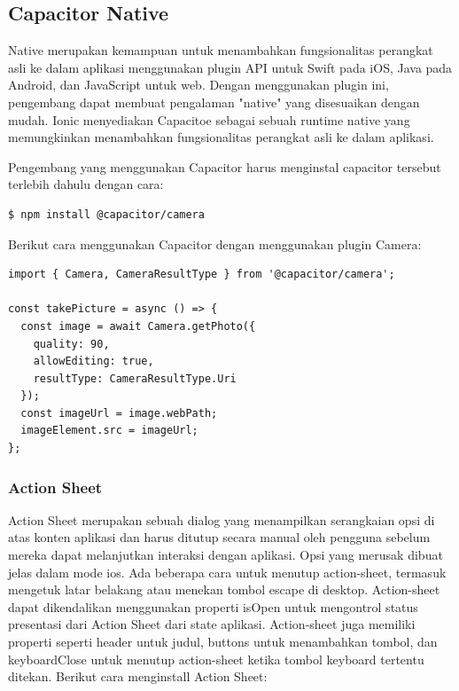 \subsection{Capacitor Native}
Native merupakan kemampuan untuk menambahkan fungsionalitas perangkat asli ke dalam aplikasi menggunakan plugin API untuk Swift pada iOS, Java pada Android, dan JavaScript untuk web. Dengan menggunakan plugin ini, pengembang dapat membuat pengalaman "native" yang disesuaikan dengan mudah. Ionic menyediakan Capacitoe sebagai sebuah runtime native yang memungkinkan menambahkan fungsionalitas perangkat asli ke dalam aplikasi.

Pengembang yang menggunakan Capacitor harus menginstal capacitor tersebut terlebih dahulu dengan cara:
\begin{lstlisting}[language=HTML, caption=Kode untuk menginstal Capacitor Camera, label=kode:install-capacitor]
$ npm install @capacitor/camera
\end{lstlisting}

Berikut cara menggunakan Capacitor dengan menggunakan plugin Camera:

\begin{lstlisting}[language=HTML, caption=Contoh kode Capacitor, label=kode:capacitor-camera-example]
import { Camera, CameraResultType } from '@capacitor/camera';

const takePicture = async () => {
  const image = await Camera.getPhoto({
    quality: 90,
    allowEditing: true,
    resultType: CameraResultType.Uri
  });
  const imageUrl = image.webPath;
  imageElement.src = imageUrl;
};
\end{lstlisting}

\subsubsection{Action Sheet}

Action Sheet merupakan sebuah dialog yang menampilkan serangkaian opsi di atas konten aplikasi dan harus ditutup secara manual oleh pengguna sebelum mereka dapat melanjutkan interaksi dengan aplikasi. Opsi yang merusak dibuat jelas dalam mode ios. Ada beberapa cara untuk menutup action-sheet, termasuk mengetuk latar belakang atau menekan tombol escape di desktop. Action-sheet dapat dikendalikan menggunakan properti isOpen untuk mengontrol status presentasi dari Action Sheet dari state aplikasi. Action-sheet juga memiliki properti seperti header untuk judul, buttons untuk menambahkan tombol, dan keyboardClose untuk menutup action-sheet ketika tombol keyboard tertentu ditekan. Berikut cara menginstall Action Sheet:

